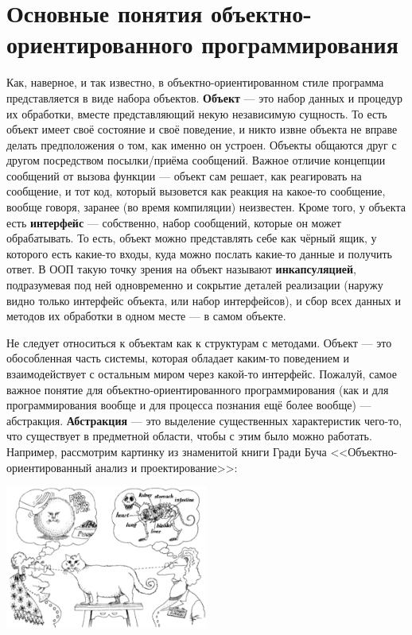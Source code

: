 \documentclass{../../text-style}
\begin{document}
\maketitle
\thispagestyle{empty}

\section{Основные понятия объектно-ориентированного программирования}

Как, наверное, и так известно, в объектно-ориентированном стиле программа представляется в виде набора объектов. \textbf{Объект} --- это набор данных и процедур их обработки, вместе представляющий некую независимую сущность. То есть объект имеет своё состояние и своё поведение, и никто извне объекта не вправе делать предположения о том, как именно он устроен. Объекты общаются друг с другом посредством посылки/приёма сообщений. Важное отличие концепции сообщений от вызова функции --- объект сам решает, как реагировать на сообщение, и тот код, который вызовется как реакция на какое-то сообщение, вообще говоря, заранее (во время компиляции) неизвестен. Кроме того, у объекта есть \textbf{интерфейс} --- собственно, набор сообщений, которые он может обрабатывать. То есть, объект можно представлять себе как чёрный ящик, у которого есть какие-то входы, куда можно послать какие-то данные и получить ответ. В ООП такую точку зрения на объект называют \textbf{инкапсуляцией}, подразумевая под ней одновременно и сокрытие деталей реализации (наружу видно только интерфейс объекта, или набор интерфейсов), и сбор всех данных и методов их обработки в одном месте --- в самом объекте.

Не следует относиться к объектам как к структурам с методами. Объект --- это обособленная часть системы, которая обладает каким-то поведением и взаимодействует с остальным миром через какой-то интерфейс. Пожалуй, самое важное понятие для объектно-ориентированного программирования (как и для программирования вообще и для процесса познания ещё более вообще) --- абстракция. \textbf{Абстракция} --- это выделение существенных характеристик чего-то, что существует в предметной области, чтобы с этим было можно работать. Например, рассмотрим картинку из знаменитой книги Гради Буча <<Объектно-ориентированный анализ и проектирование>>:

\begin{center}
    \includegraphics[width=0.5\textwidth]{abstraction.png}
\end{center}
\end{document}
